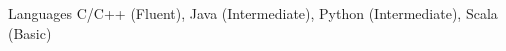 
\begin{cvskills}

  \cvskill
    { Languages} %
    { C/C++ (Fluent), Java (Intermediate), Python (Intermediate), Scala (Basic) }


\end{cvskills}

